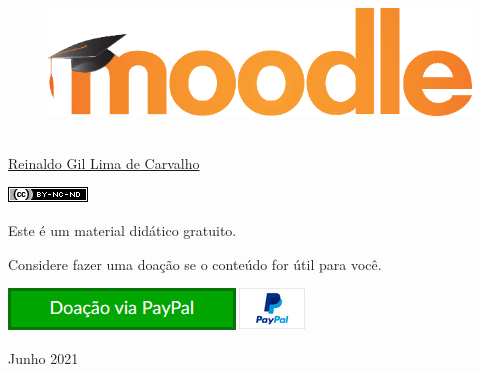 \thispagestyle{empty}

\begin{center}
  \begin{figure}[H]
    \begin{center}
      \hspace{-1cm}
      \includegraphics[width=0.55\columnwidth]{titlepage}
  ~\cite{FrontPageIMG}
    \end{center}      
  \end{figure}

  \vskip 2cm

  \hspace{-1cm}
  \begin{minipage}[c]{17cm}
    \begin{center}

{\huge {}\vskip 0.15cm %

{\large \href{http://reinaldoc.wordpress.com}{Reinaldo Gil Lima de Carvalho}} %

{\includegraphics[width=0.1\columnwidth]{imgs/license-CC-BY-NC-ND_header.png}}

\vskip 7cm

{\large {Este é um material didático gratuito.}}

\vskip 0.15cm

{\large {Considere fazer uma doação se o conteúdo for útil para você.}}

\vskip 1cm

\href{https://www.paypal.com/cgi-bin/webscr?cmd=_s-xclick&hosted_button_id=9S2QRNKE3WKM6}{
    {\includegraphics[width=0.4\columnwidth]{imgs/donate.jpg}}
  }
}
    \end{center}
  \end{minipage}

  \vskip 3cm

  {\huge Junho 2021} %
\end{center}
